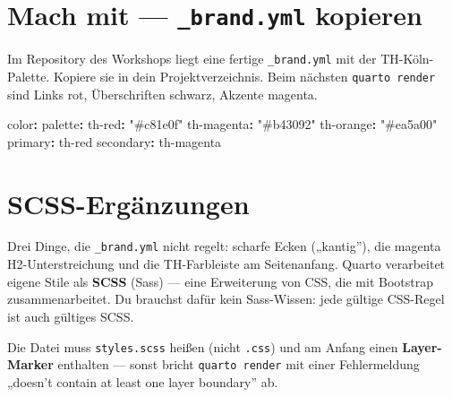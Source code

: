 \documentclass[
  ngerman,
  a4paper,
  DIV=11]{scrreprt}
\newenvironment{Shaded}{\begin{snugshade}}{\end{snugshade}}
\newcommand{\AttributeTok}[1]{\textcolor[rgb]{0.40,0.45,0.13}{#1}}
\newcommand{\FunctionTok}[1]{\textcolor[rgb]{0.28,0.35,0.67}{#1}}
\newcommand{\KeywordTok}[1]{\textcolor[rgb]{0.00,0.23,0.31}{\textbf{#1}}}
\newcommand{\StringTok}[1]{\textcolor[rgb]{0.13,0.47,0.30}{#1}}
\begin{document}
\section{\texorpdfstring{Mach mit --- \texttt{\_brand.yml}
kopieren}{Mach mit --- \_brand.yml kopieren}}\label{mach-mit-_brand.yml-kopieren}

Im Repository des Workshops liegt eine fertige \texttt{\_brand.yml} mit
der TH-Köln-Palette. Kopiere sie in dein Projektverzeichnis. Beim
nächsten \texttt{quarto\ render} sind Links rot, Überschriften schwarz,
Akzente magenta.

\begin{Shaded}
\begin{Highlighting}[]
\FunctionTok{color}\KeywordTok{:}
\AttributeTok{  }\FunctionTok{palette}\KeywordTok{:}
\AttributeTok{    }\FunctionTok{th{-}red}\KeywordTok{:}\AttributeTok{ }\StringTok{"\#c81e0f"}
\AttributeTok{    }\FunctionTok{th{-}magenta}\KeywordTok{:}\AttributeTok{ }\StringTok{"\#b43092"}
\AttributeTok{    }\FunctionTok{th{-}orange}\KeywordTok{:}\AttributeTok{ }\StringTok{"\#ea5a00"}
\AttributeTok{  }\FunctionTok{primary}\KeywordTok{:}\AttributeTok{ th{-}red}
\AttributeTok{  }\FunctionTok{secondary}\KeywordTok{:}\AttributeTok{ th{-}magenta}
\end{Highlighting}
\end{Shaded}

\section{SCSS-Ergänzungen}\label{scss-erguxe4nzungen}

Drei Dinge, die \texttt{\_brand.yml} nicht regelt: scharfe Ecken
(„kantig''), die magenta H2-Unterstreichung und die TH-Farbleiste am
Seitenanfang. Quarto verarbeitet eigene Stile als \textbf{SCSS} (Sass)
--- eine Erweiterung von CSS, die mit Bootstrap zusammenarbeitet. Du
brauchst dafür kein Sass-Wissen: jede gültige CSS-Regel ist auch
gültiges SCSS.

\begin{tcolorbox}[enhanced jigsaw, opacitybacktitle=0.6, leftrule=.75mm, title=\textcolor{quarto-callout-warning-color}{\faExclamationTriangle}\hspace{0.5em}{Warnung}, colframe=quarto-callout-warning-color-frame, arc=.35mm, toprule=.15mm, colbacktitle=quarto-callout-warning-color!10!white, bottomrule=.15mm, colback=white, rightrule=.15mm, breakable, toptitle=1mm, bottomtitle=1mm, opacityback=0, titlerule=0mm, coltitle=black, left=2mm]

Die Datei muss \texttt{styles.scss} heißen (nicht \texttt{.css}) und am
Anfang einen \textbf{Layer-Marker} enthalten --- sonst bricht
\texttt{quarto\ render} mit einer Fehlermeldung „doesn't contain at
least one layer boundary'' ab.

\end{tcolorbox}
\end{document}
